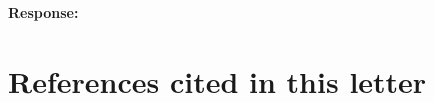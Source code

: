 \documentclass[11pt]{article}
\newenvironment{response}{\par\smallskip\noindent\color{resp}\textbf{Response:}\ }{\par}
\newenvironment{action}{\par\smallskip\noindent\color{resp}\textbf{Action:}\ }{\par}
\newcommand{\tbd}[1]{\textcolor{note}{\textsf{[#1]}}}
\newcommand{\lines}[1]{\tbd{lines #1}}
\begin{document}
\begin{response}
\end{response}


\section{References cited in this letter}
{\small
\renewcommand{\bibsection}{}
\setlength{\bibsep}{0.3ex}


}
\end{document}
